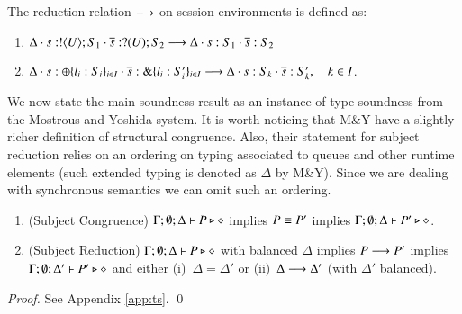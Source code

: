\begin{definition}\rm
	\label{def:ses_red}
	The reduction relation $\longrightarrow$ on session environments is defined as:
%
	\begin{enumerate}[$-$]
		\item	$\Delta \cdot s: ! \langle U \rangle ; S_1 \cdot \overline{s}: ? (U) ; S_2 \longrightarrow \Delta \cdot s: S_1 \cdot \overline{s}: S_2$
		\item	$\Delta \cdot s: \oplus \{l_i: S_i\}_{i \in I} \cdot \overline{s}: \& \{l_i: S_i'\}_{i \in I} \longrightarrow \Delta \cdot s: S_k \cdot \overline{s}: S_k', \quad k \in I$.
	\end{enumerate}
\end{definition}
%
We now state the main soundness result as an instance
of type soundness from the Mostrous and Yoshida system.
It is worth noticing that M\&Y have a slightly richer
definition of structural congruence.
Also, their statement for subject reduction relies on an
ordering on typing associated to queues and other 
runtime elements (such extended typing is denoted as $\Delta$ by M\&Y).
Since we are dealing with synchronous semantics we can omit such an ordering.

\begin{theorem}\label{t:sr}\rm
%
	\begin{enumerate}[1.]
		\item	(Subject Congruence)
			$\Gamma; \emptyset; \Delta \vdash P \triangleright \diamond$
			implies
			$P \equiv P'$ implies $\Gamma; \emptyset; \Delta \vdash P' \triangleright \diamond$.

		\item	(Subject Reduction)
			$\Gamma; \emptyset; \Delta \vdash P \triangleright \diamond$
			with
			balanced $\Delta$
			implies
			$P \longrightarrow P'$ implies $\Gamma; \emptyset; \Delta'  \vdash P' \triangleright \diamond$
			and either (i)~$\Delta = \Delta'$ or (ii)~$\Delta \longrightarrow \Delta'$
			(with $\Delta'$ balanced).
	\end{enumerate}
\end{theorem}

\begin{proof}
	See Appendix \ref{app:ts}.
	\qed
\end{proof}
